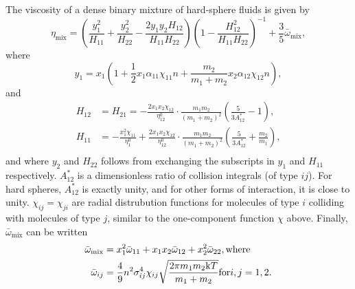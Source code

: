 The viscosity of a dense binary mixture of hard-sphere fluids is given by
\begin{equation}
    \eta_{\text{mix}} 
        = \left(
            \frac{y_1^2}{H_{11}} 
            + \frac{y_2^2}{H_{22}} 
            - \frac{2 y_1 y_2 H_{12}}{H_{11} H_{22}}
        \right)
        \left(
            1 - \frac{H_{12}^2}{H_{11} H_{22}}
        \right)^{-1}
        + \frac{3}{5} \bar{\omega}_{\text{mix}},
\end{equation}
where
\begin{equation}
    \label{eq:viscosity_binary}
    y_1 
        = x_1 \left(
            1   + \frac{1}{2} x_1 \alpha_{11} \chi_{11} n 
                + \frac{m_2}{m_1 + m_2} x_2 \alpha_{12} \chi_{12} n
        \right), 
\end{equation}
and
\begin{equation}
    \begin{split}
        H_{12} &= H_{21}
                =   -\frac{2 x_1 x_2 \chi_{12}}{\eta^0_{12}}
                    \cdot \frac{m_1 m_2}{(m_1 + m_2)^2}
                    \left( \frac{5}{3A^*_{12}} - 1 \right), \\
        H_{11}
                &=  -\frac{x_1^2 \chi_{11}}{\eta^0_1}
                    +\frac{2 x_1 x_2 \chi_{12}}{\eta^0_{12}}
                    \cdot \frac{m_1 m_2}{(m_1 + m_2)^2}
                    \left( \frac{5}{3A^*_{12}} + \frac{m_2}{m_1} \right), \\
    \end{split}
\end{equation}
and where $y_2$ and $H_{22}$ follows from exchanging the subscripts in 
$y_1$ and $H_{11}$ respectively.
$A^*_{12}$ is a dimensionless ratio of collision integrals (of type ${ij}$).
For hard spheres, $A^*_{12}$ is exactly unity, 
and for other forms of interaction, it is close to unity.
$\chi_{ij} = \chi_{ji}$ are radial distrubution functions for molecules 
of type $i$ colliding with molecules of type $j$, 
similar to the one-component function $\chi$ above.
Finally, $\bar{\omega}_{\text{mix}}$ can be written
\begin{equation}
    \begin{split}
        \bar{\omega}_{\text{mix}} 
            &= x_1^2 \bar{\omega}_{11} 
            + x_1 x_2 \bar{\omega}_{12} 
            + x_2^2 \bar{\omega}_{22}, \text{where}\\
        \bar{\omega}_{ij} 
            &= \frac{4}{9} n^2 \sigma_{ij}^4 \chi_{ij} 
            \sqrt{\frac{2\pi m_1 m_2 \mathrm{k} T}{m_1 + m_2}} 
            \text{for} i,j = 1,2.
    \end{split}
\end{equation}


